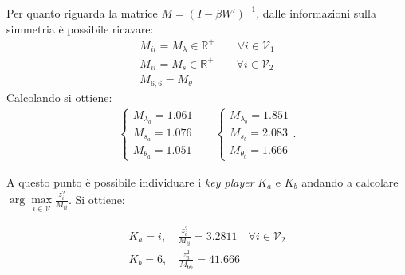 \begin{alphaparts}
  Per quanto riguarda la matrice \(M = (I- \beta W')^{-1}\), dalle informazioni sulla simmetria è possibile ricavare:
  \begin{gather*}
      M_{ii} = M_\lambda \in \mathbb{R}^+\quad\quad \forall i \in \mathcal{V}_1\\
      M_{ii} = M_s \in \mathbb{R}^+ \quad\quad \forall i \in \mathcal{V}_2\\
      M_{6,6} = M_\theta
      \end{gather*}
    Calcolando si ottiene:
    \begin{align*}
        \begin{cases}
          M_{\lambda_a} = 1.061 \\
          M_{s_a} = 1.076 \\
          M_{\theta_a }= 1.051
        \end{cases} && \begin{cases}
          M_{\lambda_b} = 1.851 \\
          M_{s_b} = 2.083 \\
          M_{\theta_b} = 1.666
        \end{cases}.
      \end{align*}

      A questo punto è possibile individuare i \textit{key player} \(K_a\) e \(K_b\) andando a calcolare \(\arg\max \limits_{i \in \mathcal{V}} \frac{z_i^2}{M_{ii}}\).  Si ottiene:
      
      \begin{gather*}
          K_a = i ,\quad   \frac{z_i^2}{M_{ii}} = 3.2811\quad \forall i \in \mathcal{V}_2 \\
          K_b = 6,\quad \frac{z_6^2}{M_{66}} = 41.666  
      \end{gather*}

\end{alphaparts}
